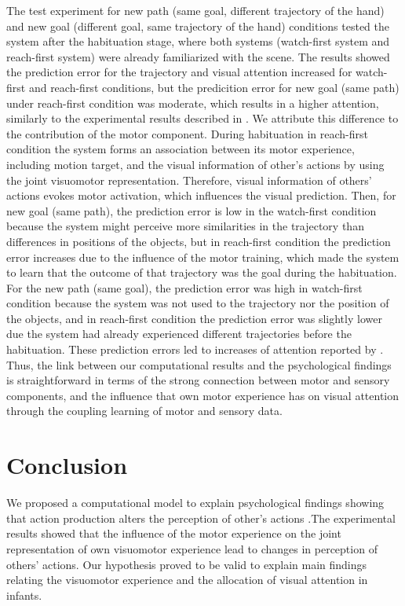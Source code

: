 \documentclass[conference]{IEEEtran}
\begin{document}
The test experiment for new path (same goal, different trajectory of the hand) and new goal (different goal, same trajectory of the hand) conditions tested the system after the habituation stage, where both systems (watch-first system and reach-first system) were already familiarized with the scene. The results showed the prediction error for the trajectory and visual attention increased for watch-first and reach-first conditions, but the predicition error for new goal (same path) under reach-first condition was moderate, which results in a higher attention, similarly to the experimental results described in \cite{sommerville2005action}. We attribute this difference to the contribution of the motor component. During habituation in reach-first condition the system forms an association between its motor experience, including motion target, and the visual information of other's actions by using the joint visuomotor representation. Therefore, visual information of others’ actions evokes motor activation, which influences the visual prediction. Then, for new goal (same path), the prediction error is low in the watch-first condition because the system might perceive more similarities in the trajectory than differences in positions of the objects, but in reach-first condition the prediction error increases due to the influence of the motor training, which made the system to learn that the outcome of that trajectory was the goal during the habituation. For the new path (same goal), the prediction error was high in watch-first condition because the system was not used to the trajectory nor the position of the objects, and in reach-first condition the prediction error was slightly lower due the system had already experienced different trajectories before the habituation. These prediction errors led to increases of attention reported by \cite{sommerville2005action}. Thus, the link between our computational results and the psychological findings is straightforward in terms of the strong connection between motor and sensory components, and the influence that own motor experience has on visual attention through the coupling learning of motor and sensory data.

\section{Conclusion}
We proposed a computational model to explain psychological findings showing that action production alters the perception of other's actions \cite{sommerville2005action}.The experimental results showed that the influence of the motor experience on the joint representation of own visuomotor experience lead to changes in perception of others' actions. Our hypothesis proved to be valid to explain main findings relating the visuomotor experience and the allocation of visual attention in infants.
\end{document}
